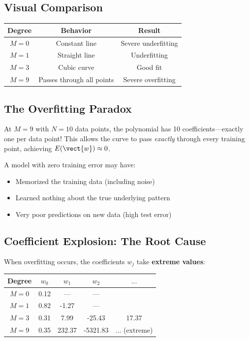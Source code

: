 \subsection{Visual Comparison}

\begin{center}
\renewcommand{\arraystretch}{1.5}
\begin{tabular}{|c|c|c|}
\hline
\textbf{Degree} & \textbf{Behavior} & \textbf{Result} \\ \hline
$M = 0$ & Constant line & Severe underfitting \\ \hline
$M = 1$ & Straight line & Underfitting \\ \hline
$M = 3$ & Cubic curve & \colorbox{green!20}{Good fit} \\ \hline
$M = 9$ & Passes through all points & Severe overfitting \\ \hline
\end{tabular}
\end{center}

\subsection{The Overfitting Paradox}

At $M = 9$ with $N = 10$ data points, the polynomial has 10 coefficients---exactly one per data point! This allows the curve to pass \textit{exactly} through every training point, achieving $E(\vect{w}) \approx 0$.

\begin{importantbox}
A model with zero training error may have:
\begin{itemize}
    \item Memorized the training data (including noise)
    \item Learned nothing about the true underlying pattern
    \item Very poor predictions on new data (high test error)
\end{itemize}
\end{importantbox}

\subsection{Coefficient Explosion: The Root Cause}

When overfitting occurs, the coefficients $w_j$ take \textbf{extreme values}:

\begin{center}
\begin{tabular}{|c|c|c|c|c|}
\hline
\textbf{Degree} & $w_0$ & $w_1$ & $w_2$ & $\ldots$ \\ \hline
$M = 0$ & 0.12 & --- & --- & \\ \hline
$M = 1$ & 0.82 & -1.27 & --- & \\ \hline
$M = 3$ & 0.31 & 7.99 & -25.43 & 17.37 \\ \hline
$M = 9$ & 0.35 & 232.37 & -5321.83 & $\ldots$ (extreme) \\ \hline
\end{tabular}
\end{center}

